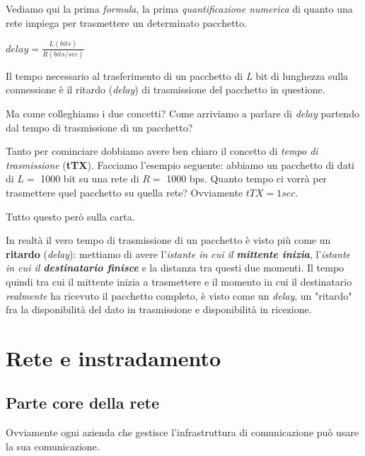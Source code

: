 \documentclass[10pt, a4paper, openany]{book}
\begin{document}
\noindent Vediamo qui la prima \textit{formula}, la prima \textit{quantificazione numerica} di quanto una rete impiega per trasmettere un determinato pacchetto.

\begin{center}
    $delay=\frac{L (bits)}{R (bits/sec)}$
\end{center}

\noindent Il tempo necessario al trasferimento di un pacchetto di \textit{L} bit di lunghezza sulla connessione è il ritardo (\textit{delay}) di trasmissione del pacchetto in questione.

\vspace{0.5cm}

\noindent Ma come colleghiamo i due concetti? Come arriviamo a parlare di \textit{delay} partendo dal tempo di trasmissione di un pacchetto?

\noindent Tanto per cominciare dobbiamo avere ben chiaro il concetto di \textit{tempo di trasmissione} (\textbf{tTX}). Facciamo l'esempio seguente: abbiamo un pacchetto di dati di $L =$ 1000 bit su una rete di $R =$ 1000 bps. Quanto tempo ci vorrà per trasmettere quel pacchetto su quella rete? Ovviamente $tTX = 1 sec$.

\noindent Tutto questo però sulla carta.

\noindent In realtà il vero tempo di trasmissione di un pacchetto è visto più come un \textbf{ritardo} (\textit{delay}): mettiamo di avere l'\textit{istante in cui il \textbf{mittente inizia}}, l'\textit{istante in cui il \textbf{destinatario finisce}} e la distanza tra questi due momenti. Il tempo quindi tra cui il mittente inizia a trasmettere e il momento in cui il destinatario \textit{realmente} ha ricevuto il pacchetto completo, è visto come un \textit{delay}, un "ritardo" fra la disponibilità del dato in trasmissione e disponibilità in ricezione.

\section{Rete e instradamento}

\subsection{Parte core della rete}

\noindent Ovviamente ogni azienda che gestisce l'infrastruttura di comunicazione può usare la sua comunicazione. 
\end{document}
